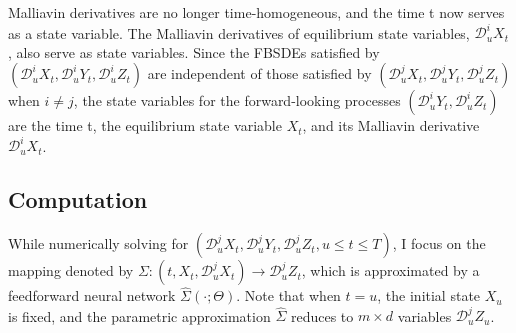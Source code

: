 \documentclass{article}
\begin{document}
Malliavin derivatives are no longer time-homogeneous, and the time t now serves as a state variable. The Malliavin derivatives of equilibrium state variables, $\mathcal{D}_{u}^{i}X_{t}$, also serve as state variables. Since the FBSDEs satisfied by $(\mathcal{D}_{u}^{i}X_{t},\mathcal{D}_{u}^{i}Y_{t},\mathcal{D}_{u}^{i}Z_{t})$ are independent of those satisfied by $(\mathcal{D}_{u}^{j}X_{t},\mathcal{D}_{u}^{j}Y_{t},\mathcal{D}_{u}^{j}Z_{t})$ when $i\ne j$, the state variables for the forward-looking processes $(\mathcal{D}_{u}^{i}Y_{t},\mathcal{D}_{u}^{i}Z_{t})$ are the time t, the equilibrium state variable $X_{t}$, and its Malliavin derivative $\mathcal{D}_{u}^{i}X_{t}$.

\subsection{Computation}

While numerically solving for $(\mathcal{D}_{u}^{j}X_{t}, \mathcal{D}_{u}^{j}Y_{t}, \mathcal{D}_{u}^{j}Z_{t}, u\le t\le T)$, I focus on the mapping denoted by $\Sigma:(t,X_{t},\mathcal{D}_{u}^{j}X_{t})\rightarrow\mathcal{D}_{u}^{j}Z_{t}$, which is approximated by a feedforward neural network $\hat{\Sigma}(\cdot;\Theta)$. Note that when $t=u$, the initial state $X_{u}$ is fixed, and the parametric approximation $\hat{\Sigma}$ reduces to $m\times d$ variables $\mathcal{D}_{u}^{j}Z_{u}$.
\end{document}
